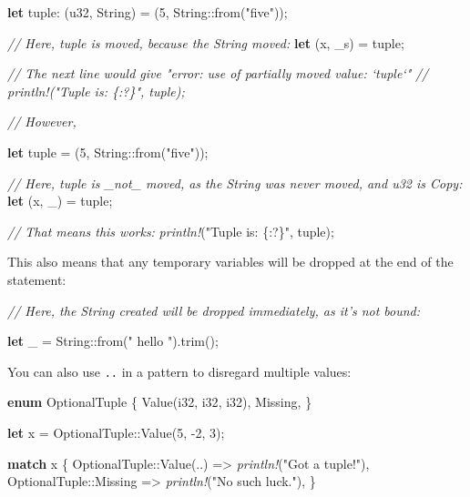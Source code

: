 \documentclass[a4paper,]{book}
\newenvironment{Shaded}{\begin{snugshade}}{\end{snugshade}}
\newcommand{\KeywordTok}[1]{\textcolor[rgb]{0.13,0.29,0.53}{\textbf{{#1}}}}
\newcommand{\DataTypeTok}[1]{\textcolor[rgb]{0.13,0.29,0.53}{{#1}}}
\newcommand{\DecValTok}[1]{\textcolor[rgb]{0.00,0.00,0.81}{{#1}}}
\newcommand{\StringTok}[1]{\textcolor[rgb]{0.31,0.60,0.02}{{#1}}}
\newcommand{\CommentTok}[1]{\textcolor[rgb]{0.56,0.35,0.01}{\textit{{#1}}}}
\newcommand{\PreprocessorTok}[1]{\textcolor[rgb]{0.56,0.35,0.01}{\textit{{#1}}}}
\newcommand{\NormalTok}[1]{{#1}}
\begin{document}
\begin{Shaded}
\begin{Highlighting}[]
\KeywordTok{let} \NormalTok{tuple: (}\DataTypeTok{u32}\NormalTok{, }\DataTypeTok{String}\NormalTok{) = (}\DecValTok{5}\NormalTok{, }\DataTypeTok{String}\NormalTok{::from(}\StringTok{"five"}\NormalTok{));}

\CommentTok{// Here, tuple is moved, because the String moved:}
\KeywordTok{let} \NormalTok{(x, _s) = tuple;}

\CommentTok{// The next line would give "error: use of partially moved value: `tuple`"}
\CommentTok{// println!("Tuple is: \{:?\}", tuple);}

\CommentTok{// However,}

\KeywordTok{let} \NormalTok{tuple = (}\DecValTok{5}\NormalTok{, }\DataTypeTok{String}\NormalTok{::from(}\StringTok{"five"}\NormalTok{));}

\CommentTok{// Here, tuple is _not_ moved, as the String was never moved, and u32 is Copy:}
\KeywordTok{let} \NormalTok{(x, _) = tuple;}

\CommentTok{// That means this works:}
\PreprocessorTok{println!}\NormalTok{(}\StringTok{"Tuple is: \{:?\}"}\NormalTok{, tuple);}
\end{Highlighting}
\end{Shaded}

This also means that any temporary variables will be dropped at the end
of the statement:

\begin{Shaded}
\begin{Highlighting}[]
\CommentTok{// Here, the String created will be dropped immediately, as it’s not bound:}

\KeywordTok{let} \NormalTok{_ = }\DataTypeTok{String}\NormalTok{::from(}\StringTok{"  hello  "}\NormalTok{).trim();}
\end{Highlighting}
\end{Shaded}

You can also use \texttt{..} in a pattern to disregard multiple values:

\begin{Shaded}
\begin{Highlighting}[]
\KeywordTok{enum} \NormalTok{OptionalTuple \{}
    \NormalTok{Value(}\DataTypeTok{i32}\NormalTok{, }\DataTypeTok{i32}\NormalTok{, }\DataTypeTok{i32}\NormalTok{),}
    \NormalTok{Missing,}
\NormalTok{\}}

\KeywordTok{let} \NormalTok{x = OptionalTuple::Value(}\DecValTok{5}\NormalTok{, -}\DecValTok{2}\NormalTok{, }\DecValTok{3}\NormalTok{);}

\KeywordTok{match} \NormalTok{x \{}
    \NormalTok{OptionalTuple::Value(..) => }\PreprocessorTok{println!}\NormalTok{(}\StringTok{"Got a tuple!"}\NormalTok{),}
    \NormalTok{OptionalTuple::Missing => }\PreprocessorTok{println!}\NormalTok{(}\StringTok{"No such luck."}\NormalTok{),}
\NormalTok{\}}
\end{Highlighting}
\end{Shaded}
\end{document}
